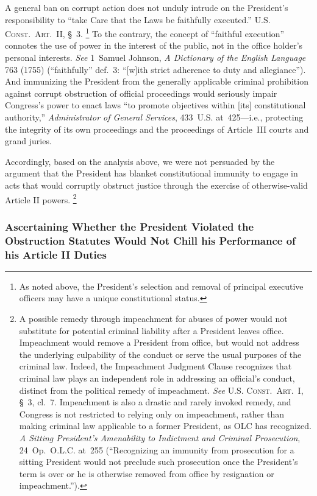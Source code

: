 A general ban on corrupt action does not unduly intrude on the President's responsibility to ``take Care that the Laws be faithfully executed.''
\textsc{U.S. Const.\ Art.~II}, \S~3.%
\footnote{As noted above, the President's selection and removal of principal executive officers may have a unique constitutional status.}
To the contrary, the concept of ``faithful execution'' connotes the use of power in the interest of the public, not in the office holder's personal interests.
\textit{See} 1~Samuel Johnson, \textit{A Dictionary of the English Language} 763 (1755) (``faithfully'' def.~3: ``[w]ith strict adherence to duty and allegiance'').
And immunizing the President from the generally applicable criminal prohibition against corrupt obstruction of official proceedings would seriously impair Congress's power to enact laws ``to promote objectives within [its] constitutional authority,'' \textit{Administrator of General Services}, 433~U.S. at~425---i.e., protecting the integrity of its own proceedings and the proceedings of Article~III courts and grand juries.

Accordingly, based on the analysis above, we were not persuaded by the argument that the President has blanket constitutional immunity to engage in acts that would corruptly obstruct justice through the exercise of otherwise-valid Article II powers.%
\footnote{A possible remedy through impeachment for abuses of power would not substitute for potential criminal liability after a President leaves office.
Impeachment would remove a President from office, but would not address the underlying culpability of the conduct or serve the usual purposes of the criminal law.
Indeed, the Impeachment Judgment Clause recognizes that criminal law plays an independent role in addressing an official's conduct, distinct from the political remedy of impeachment.
\textit{See} \textsc{U.S. Const.\ Art.~I}, \S~3, cl.~7.
Impeachment is also a drastic and rarely invoked remedy, and Congress is not restricted to relying only on impeachment, rather than making criminal law applicable to a former President, as OLC has recognized.
\textit{A Sitting President's Amenability to Indictment and Criminal Prosecution}, 24~Op.\ O.L.C. at~255 (``Recognizing an immunity from prosecution for a sitting President would not preclude such prosecution once the President's term is over or he is otherwise removed from office by resignation or impeachment.'').}

\subsubsection{Ascertaining Whether the President Violated the Obstruction Statutes Would Not Chill his Performance of his Article II Duties}

